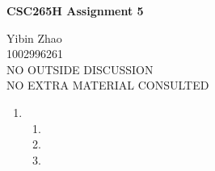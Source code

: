 \documentclass[10pt]{article}
\begin{document}
\begin{center}
{\bf \Large \bf CSC265H Assignment 5}
\end{center}

\noindent
Yibin Zhao\\
1002996261\\
NO OUTSIDE DISCUSSION\\
NO EXTRA MATERIAL CONSULTED\\

\begin{enumerate}
	\item 
		\begin{enumerate}
			\item
				
			\item
			\item
		\end{enumerate}
\end{enumerate}
\end{document}
